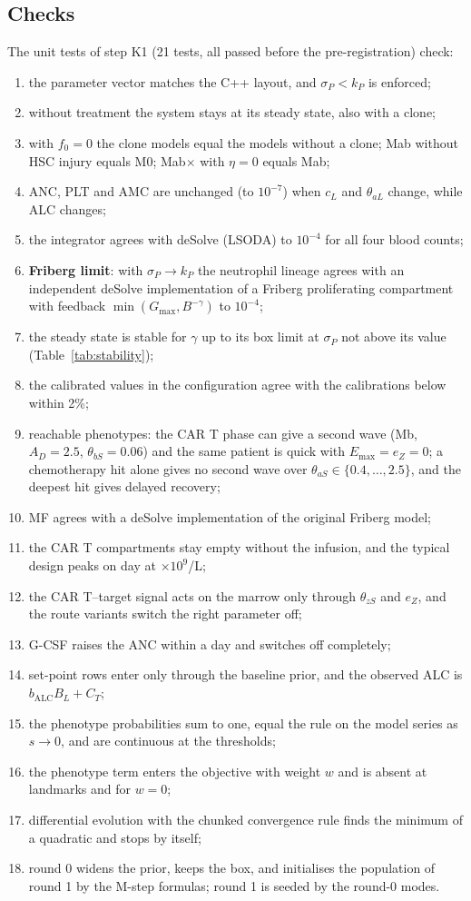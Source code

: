 \documentclass[11pt]{article}
\begin{document}
\subsection{Checks}
The unit tests of step K1 (21 tests, all passed before the pre-registration) check:
\begin{enumerate}
\item the parameter vector matches the C++ layout, and $\sigma_P<k_P$ is enforced;
\item without treatment the system stays at its steady state, also with a clone;
\item with $f_0=0$ the clone models equal the models without a clone; Mab without HSC injury equals M0; Mab$\times$ with $\eta=0$ equals Mab;
\item ANC, PLT and AMC are unchanged (to $10^{-7}$) when $c_L$ and $\theta_{aL}$ change, while ALC changes;
\item the integrator agrees with deSolve (LSODA) to $10^{-4}$ for all four blood counts;
\item \textbf{Friberg limit}: with $\sigma_P\to k_P$ the neutrophil lineage agrees with an independent deSolve implementation of a Friberg proliferating compartment with feedback $\min(G_{\max},B^{-\gamma})$ to $10^{-4}$;
\item the steady state is stable for $\gamma$ up to its box limit at $\sigma_P$ not above its value (Table~\ref{tab:stability});
\item the calibrated values in the configuration agree with the calibrations below within 2\%;
\item reachable phenotypes: the CAR T phase can give a second wave (Mb, $A_D=2.5$, $\theta_{bS}=0.06$) and the same patient is quick with $E_{\max}=e_Z=0$; a chemotherapy hit alone gives no second wave over $\theta_{aS}\in\{0.4,\dots,2.5\}$, and the deepest hit gives delayed recovery;
\item MF agrees with a deSolve implementation of the original Friberg model;
\item the CAR T compartments stay empty without the infusion, and the typical design peaks on day \valCartPeakDay{} at \valCartPeak{} $\times10^9$/L;
\item the CAR T--target signal acts on the marrow only through $\theta_{zS}$ and $e_Z$, and the route variants switch the right parameter off;
\item G-CSF raises the ANC within a day and switches off completely;
\item set-point rows enter only through the baseline prior, and the observed ALC is $b_{\mathrm{ALC}}B_L+C_T$;
\item the phenotype probabilities sum to one, equal the rule on the model series as $s\to0$, and are continuous at the thresholds;
\item the phenotype term enters the objective with weight $w$ and is absent at landmarks and for $w=0$;
\item differential evolution with the chunked convergence rule finds the minimum of a quadratic and stops by itself;
\item round 0 widens the prior, keeps the box, and initialises the population of round 1 by the M-step formulas; round 1 is seeded by the round-0 modes.
\end{enumerate}
\end{document}

